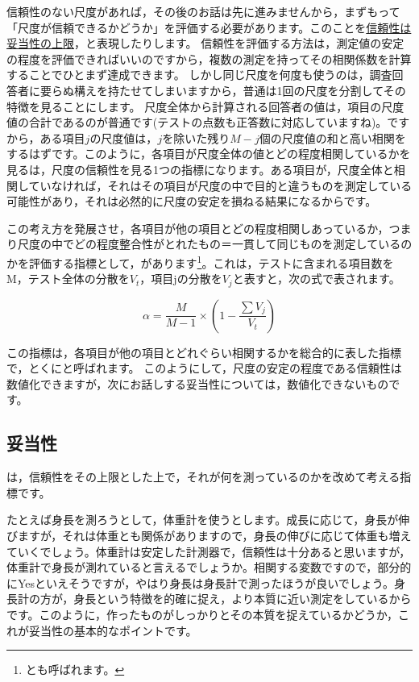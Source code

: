 \documentclass{ltjsbook}
\begin{document}
信頼性のない尺度があれば，その後のお話は先に進みませんから，まずもって「尺度が信頼できるかどうか」を評価する必要があります。このことを\underline{信頼性は妥当性の上限}，と表現したりします。
信頼性を評価する方法は，測定値の安定の程度を評価できればいいのですから，複数の測定を持ってその相関係数を計算することでひとまず達成できます。
しかし同じ尺度を何度も使うのは，調査回答者に要らぬ構えを持たせてしまいますから，普通は1回の尺度を分割してその特徴を見ることにします。
尺度全体から計算される回答者の値は，項目の尺度値の合計であるのが普通です(テストの点数も正答数に対応していますね)。ですから，ある項目$j$の尺度値は，$j$を除いた残り$M-j$個の尺度値の和と高い相関をするはずです。このように，各項目が尺度全体の値とどの程度相関しているかを見るは，尺度の信頼性を見る1つの指標になります。ある項目が，尺度全体と相関していなければ，それはその項目が尺度の中で目的と違うものを測定している可能性があり，それは必然的に尺度の安定を損ねる結果になるからです。

この考え方を発展させ，各項目が他の項目とどの程度相関しあっているか，つまり尺度の中でどの程度整合性がとれたもの＝一貫して同じものを測定しているのかを評価する指標として，があります\footnote{とも呼ばれます。}。これは，テストに含まれる項目数をM，テスト全体の分散を$V_t$，項目jの分散を$V_j$と表すと，次の式で表されます。

\[  \alpha =   \frac{M}{M-1} \times \left(1-\frac{\sum V_j}{V_t} \right) \]

この指標は，各項目が他の項目とどれぐらい相関するかを総合的に表した指標で，とくにと呼ばれます。
このようにして，尺度の安定の程度である信頼性は数値化できますが，次にお話しする妥当性については，数値化できないものです。


\subsection{妥当性}
は，信頼性をその上限とした上で，それが何を測っているのかを改めて考える指標です。

たとえば身長を測ろうとして，体重計を使うとします。成長に応じて，身長が伸びますが，それは体重とも関係がありますので，身長の伸びに応じて体重も増えていくでしょう。体重計は安定した計測器で，信頼性は十分あると思いますが，体重計で身長が測れていると言えるでしょうか。相関する変数ですので，部分的にYesといえそうですが，やはり身長は身長計で測ったほうが良いでしょう。身長計の方が，身長という特徴を的確に捉え，より本質に近い測定をしているからです。このように，作ったものがしっかりとその本質を捉えているかどうか，これが妥当性の基本的なポイントです。
\end{document}
